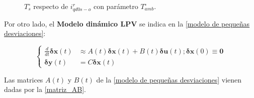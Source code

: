 \documentclass[a4paper, 10pt, onecolumn,journal]{ieeeconf}
\begin{document}
\begin{figure}[thpb]
    \centering
    \begin{adjustbox}{scale = 0.6}
    \end{adjustbox}
    \caption{$T^{\circ}_s$ respecto de $i^r_{qd0s-o}$ con parámetro $T^{\circ}_{amb}$.}
    \label{grafica T_s respecto a la corriente}
\end{figure}

Por otro lado, el \textbf{Modelo dinámico LPV} se indica en la \cref{modelo de pequeñas desviaciones}:

\begin{equation}
    \begin{cases}
        \frac{d}{dt} \mathbf{\delta x}(t) &\approx A(t) \mathbf{\delta x}(t) + B(t) \mathbf{\delta u}(t); \mathbf{\delta x}(0) \equiv \mathbf{0}\\
        \mathbf{\delta y}(t) &= C\mathbf{\delta x}(t)
    \end{cases}
    \label{modelo de pequeñas desviaciones}
\end{equation}

Las matrices $A(t)$ y $B(t)$ de la \cref{modelo de pequeñas desviaciones} vienen dadas por la \cref{matriz_AB}.
\end{document}
